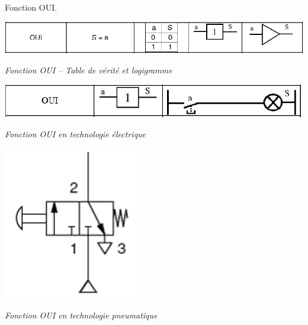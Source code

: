 \documentclass[11pt,oneside]{article}
\begin{document}
\begin{exemple}
Fonction OUI.

\begin{minipage}[c]{.3\linewidth}
\begin{center}
\includegraphics[width=.9\textwidth]{png/oui_logi}

\textit{Fonction OUI -- Table de vérité et logigramme}
\end{center}
\end{minipage} \hfill
\begin{minipage}[c]{.3\linewidth}
\begin{center}
\includegraphics[width=.9\textwidth]{png/oui_elec}

\textit{Fonction OUI en technologie électrique}
\end{center}
\end{minipage} \hfill
\begin{minipage}[c]{.3\linewidth}
\begin{center}
\includegraphics[width=.9\textwidth]{png/oui_pneu}

\textit{Fonction OUI en technologie pneumatique}
\end{center}
\end{minipage}
\end{exemple}
\end{document}
